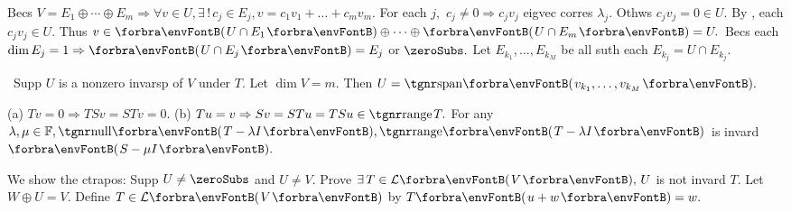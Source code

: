 Becs $V=E_1\oplus\cdots\oplus E_m\Rightarrow\forall v\in U,\exists\,!\,c_j\in E_j,v=c_1v_1+\dots+c_mv_m.$\parSol{}
For each $j,$ $c_j\neq 0\Rightarrow c_jv_j$ eigvec corres $\lambda_j.$ Othws $c_jv_j=0\in U.$\parSol{}
By , each $c_jv_j\in U.$ Thus $v\in\Par{U\cap E_1}\oplus\dots\oplus\Par{U\cap E_m}=U.$\PfEnd\vspace{2pt}
\ACoro Becs each $\dim E_j=1\Rightarrow\Par{U\cap E_j}=E_j$ or $\zeroSubs.$ Let $E_{k_1},\dots,E_{k_M}$ be all suth each $E_{k_j}=U\cap E_{k_j}.$\par
\BulletPointX{}\,\,\,{\tgsl Supp $U$ is a nonzero invarsp of $V$ under $T.$ Let $\dim V=m.$ Then $U=\Span{v_{k_1},\dots,v_{k_M}}.$}
\SepLine

(a) $Tv=0\Rightarrow TSv=STv=0.$ \;\; (b) $Tu=v\Rightarrow Sv=STu=TSu\in\range T.$\PfEnd
\ACoro For any $\lambda,\mu\in\Fbb,\Null\Par{T-\lambda I},\Range\Par{T-\lambda I}$ is invard $\Par{S-\mu I}.$\vspace{-2pt}
\SepLine

We show the ctrapos: {\tgsl Supp $U\neq\zeroSubs$ and $U\neq V.$ Prove $\exists\,T\in\Lm{V},\,U$ is not invard $T$.}\parSol{}
Let $W\oplus U=V.$ Define $T\in\Lm{V}$ by $T\Par{u+w}=w.$\PfEnd
\SepLine
\pagebreak

